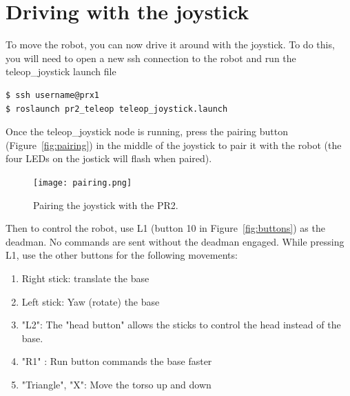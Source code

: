 \section{Driving with the joystick}
To move the robot, you can now drive it around with the joystick.  To do this, you will need to open a new ssh connection 
to the robot and run the teleop\_joystick launch file
\begin{verbatim}
$ ssh username@prx1
$ roslaunch pr2_teleop teleop_joystick.launch 
\end{verbatim}
Once the teleop\_joystick node is running, press the pairing button (Figure~\ref{fig:pairing}) in the middle of the 
joystick to pair it with the robot (the four LEDs on the jostick will flash when paired). 
\begin{figure}[H]
\centering
\texttt{[image: pairing.png]}
\caption{Pairing the joystick with the PR2.}
\label{fig:ps3_pairing}
\end{figure}
Then to control the robot, use L1 (button 10 in Figure~\ref{fig:buttons}) as the deadman.
No commands are sent without the deadman engaged.
While pressing L1, use the other buttons for the following movements:
\begin{enumerate}
\item Right stick: translate the base
\item Left stick: Yaw (rotate) the base
\item "L2": The "head button" allows the sticks to control the head instead of the base.
\item "R1" : Run button commands the base faster
\item "Triangle", "X": Move the torso up and down 
\end{enumerate}
